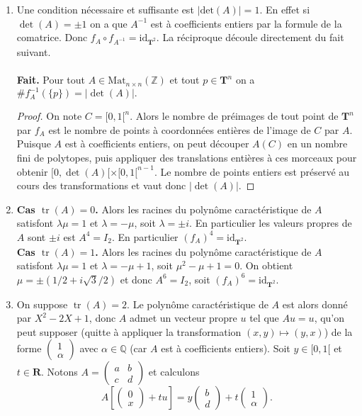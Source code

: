 \documentclass[a4paper,12pt,openany]{article}
\theoremstyle{plain}
\theoremstyle{definition}
\newcommand{\T}{\mathbf{T}}
\newcommand{\R}{\mathbf{R}}
\DeclareMathOperator{\tr}{tr}
\newcommand{\id}{\mathrm{id}}
\begin{document}
\begin{enumerate}
\item Une condition n\'ecessaire et suffisante est $|\mathrm{det}(A)| = 1$. En effet si $\det(A) = \pm 1$ on a que $A^{-1}$ est \`a coefficients entiers par la formule de la comatrice. Donc $f_A \circ f_{A^{-1}} = \id_{\T^2}$. La r\'eciproque d\'ecoule directement du fait suivant. \\ \\
\textbf{Fait.} Pour tout $A \in \mathrm{Mat}_{n \times n}(\mathbb{Z})$ et tout $p \in \T^n$ on a $ \# f_A^{-1}(\{p\}) = |{\det}(A)|.$
\begin{proof}
On note $C = [0, 1[^n$. Alors le nombre de pr\'eimages de tout point de $\T^n$ par $f_A$ est le nombre de points \`a coordonn\'ees enti\`eres de l'image de $C$ par $A$.  Puisque $A$ est \`a coefficients entiers, on peut d\'ecouper $A(C)$ en un nombre fini de polytopes, puis appliquer des translations enti\`eres \`a ces morceaux pour obtenir $[0, \det(A)[ \times [0, 1[^{n-1}$. Le nombre de points entiers est pr\'eserv\'e au cours des transformations et vaut donc $|{\det(A)}|$.
\end{proof}
\item \textbf{Cas $\tr(A) = 0$.} Alors les racines du polyn\^ome caract\'eristique de $A$ satisfont $\lambda \mu = 1$ et $\lambda = - \mu$, soit $\lambda = \pm i$. En particulier les valeurs propres de $A$ sont $\pm i$ est $A^4 = I_2$. En particulier $(f_A)^4 = \id_{\T^2}$.\\
\textbf{Cas $\tr(A) = 1$.} Alors les racines du polyn\^ome caract\'eristique de $A$ satisfont $\lambda \mu = 1$ et $\lambda = - \mu + 1$, soit $\mu^2 - \mu + 1 = 0$. On obtient $\mu = \pm (1/2 + i \sqrt{3}/2)$ et donc $A^6 = I_2$, soit $(f_A)^6 = \id_{\T^2}$.
\item On suppose $\tr(A) = 2$. Le polyn\^ome caract\'eristique de $A$ est alors donn\'e par $X^2 - 2X +1$, donc $A$ admet un vecteur propre $u$ tel que $Au = u$, qu'on peut supposer (quitte \`a appliquer la transformation $(x, y) \mapsto (y,x)$) de la forme $\begin{pmatrix} 1 \\\alpha \end{pmatrix}$ avec $\alpha \in \mathbb{Q}$ (car $A$ est \`a coefficients entiers). Soit $y \in [0,1[$ et $t \in \R$. Notons $A = \begin{pmatrix} a & b \\ c & d \end{pmatrix}$ et calculons
$$
A \left[ \begin{pmatrix} 0 \\ x  \end{pmatrix} + t u \right] = y \begin{pmatrix} b \\ d  \end{pmatrix} + t \begin{pmatrix} 1 \\ \alpha  \end{pmatrix}.
$$
\end{enumerate}
\end{document}
